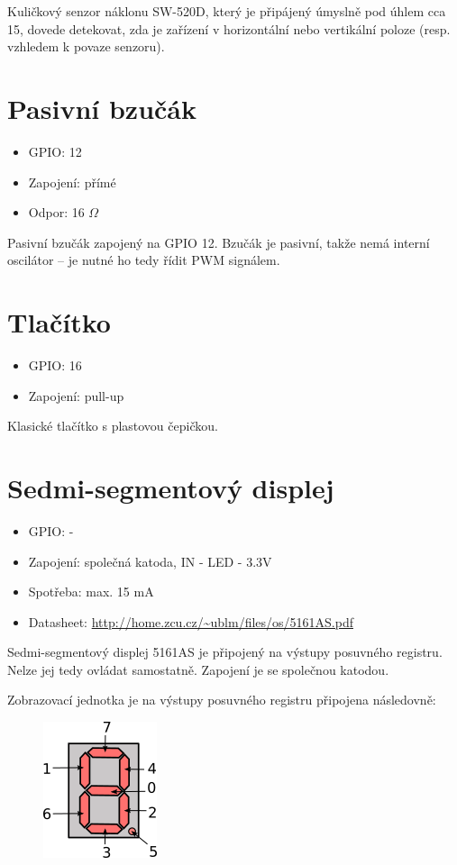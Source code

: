 \documentclass{article}
\begin{document}
Kuličkový senzor náklonu SW-520D, který je připájený úmyslně pod úhlem cca 15\degree, dovede detekovat, zda je zařízení v horizontální nebo vertikální poloze (resp.  vzhledem k povaze senzoru).

\section{Pasivní bzučák}

\begin{itemize}
	\item GPIO: 12
	\item Zapojení: přímé
	\item Odpor: 16 $\Omega$
\end{itemize}

Pasivní bzučák zapojený na GPIO 12. Bzučák je pasivní, takže nemá interní oscilátor -- je nutné ho tedy řídit PWM signálem.

\section{Tlačítko}

\begin{itemize}
	\item GPIO: 16
	\item Zapojení: pull-up
\end{itemize}

Klasické tlačítko s plastovou čepičkou.

\section{Sedmi-segmentový displej}

\begin{itemize}
	\item GPIO: -
	\item Zapojení: společná katoda, IN - LED - 3.3V
	\item Spotřeba: max. 15 mA
	\item Datasheet: \url{http://home.zcu.cz/~ublm/files/os/5161AS.pdf}
\end{itemize}

Sedmi-segmentový displej 5161AS je připojený na výstupy posuvného registru. Nelze jej tedy ovládat samostatně. Zapojení je se společnou katodou.

Zobrazovací jednotka je na výstupy posuvného registru připojena následovně:
\begin{figure}[ht!]
	\centering
	\includegraphics[width=0.3\linewidth]{kiv-dpp-01-segments.png}
\end{figure}
\end{document}
